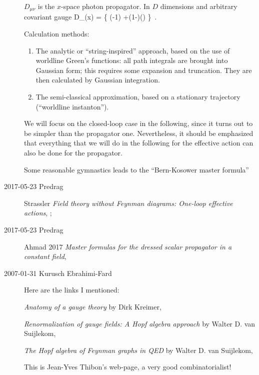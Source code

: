 \begin{description}
$D_{\mu\nu} $ is the $x$-space photon
propagator. In $D$ dimensions and arbitrary covariant gauge
\beq
D_{\mu\nu}(x) =
\Big\{
\Gamma\Big(-1\Big)
    +(1-\xi)\Gamma\Big(\Big)
\Big\}
\,.

Calculation methods:
\begin{enumerate}
  \item
The analytic or ``string-inspired'' approach, based on the use of
worldline Green's functions: all path integrals are brought into Gaussian
form; this requires some expansion and truncation. They are then
calculated by Gaussian integration.
  \item
The semi-classical approximation, based on a stationary trajectory
(``worldline instanton'').
\end{enumerate}
We will focus on the closed-loop case in the following, since it turns out to
be simpler than the propagator one. Nevertheless, it should be emphasized
that everything that we will do in the following for the effective action can
also be done for the propagator.

Some reasonable gymnastics leads to the ``Bern-Kosower master
formula''

\item[2017-05-23 Predrag]
Strassler
{\em Field theory without {Feynman} diagrams: {One}-loop effective actions},
;

\item[2017-05-23 Predrag]
Ahmad \etal{} 2017
{\em Master formulas for the dressed scalar propagator in a constant field},

\item[2007-01-31 Kurusch Ebrahimi-Fard]
 \label{sect:BrDeKr96}
Here are the links I mentioned:

\emph{Anatomy of a gauge theory} by
Dirk Kreimer,

\emph{Renormalization of gauge fields: A Hopf algebra approach} by
Walter D. van Suijlekom,

\emph{The Hopf algebra of Feynman graphs in QED} by
Walter D. van Suijlekom,

This is Jean-Yves Thibon's
 {web-page},
a very good combinatorialist!


\end{description}
